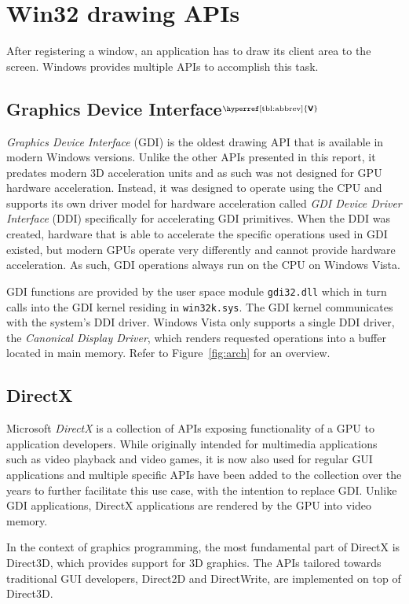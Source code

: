 \documentclass[10pt,twocolumn,a4paper]{article}
\newcommand{\bs}[1]{\textbf{\sffamily #1}}
\newcommand{\winver}[1]{$^{\text{\hyperref[tbl:abbrev]{\bs{#1}}}}$}
\newcommand{\winsubsection}[2]{\subsection[#1]{#1\winver{#2}}}
\begin{document}
	\section{Win32 drawing APIs}
		After registering a window, an application has to draw its client area
		to the screen. Windows provides multiple APIs to accomplish this task.

		\winsubsection{Graphics Device Interface}{V} \label{sec:gdi}
			\textit{Graphics Device Interface} (GDI) is the oldest drawing API
			that is available in modern Windows versions. Unlike the other
			APIs presented in this report,
			it predates modern 3D acceleration units and as such
			was not designed for GPU hardware acceleration. Instead, it was
			designed to operate using the CPU and supports its own driver model
			for hardware acceleration called \textit{GDI Device Driver
			Interface} (DDI) specifically for accelerating GDI
			primitives. When the DDI was created, hardware that is able to
			accelerate the specific operations used in GDI existed, but modern GPUs operate
			very differently and cannot provide hardware acceleration. As such,
			GDI operations always run on the CPU on Windows Vista. \cite{d2dvsgdi}

			GDI functions are provided by the user space module
			\texttt{gdi32.dll} which in turn calls into the GDI kernel residing
			in \texttt{win32k.sys}. The GDI kernel communicates with the
			system's DDI driver. Windows Vista only supports a single DDI driver,
			the \textit{Canonical Display Driver}, which renders requested operations
			into a buffer located in main memory. Refer to Figure~\ref{fig:arch}
			for an overview. \cite{d2dvsgdi, dwmredirect}

		\subsection{DirectX}
			Microsoft \textit{DirectX} is a collection of APIs exposing functionality of
			a GPU to application developers. While originally intended for
			multimedia applications such as video playback and video games, it
			is now also used for regular GUI applications and multiple specific
			APIs have been added to the collection over the years to further
			facilitate this use case, with the intention to replace GDI.
			Unlike GDI applications, DirectX applications
			are rendered by the GPU into video memory. \cite{d2dvsgdi,aboutd2d}

			In the context of graphics programming, the most fundamental part of
			DirectX is Direct3D, which provides support for 3D graphics. The
			APIs tailored towards traditional GUI developers, Direct2D and
			DirectWrite, are implemented on top of Direct3D. \cite{aboutd2d}
\end{document}
